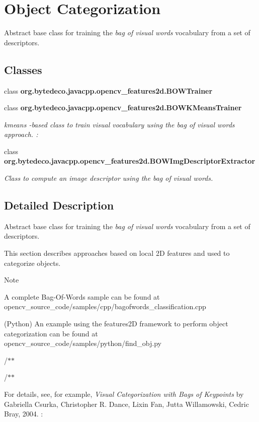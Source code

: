 \hypertarget{group__features2d__category}{}\section{Object Categorization}
\label{group__features2d__category}


Abstract base class for training the {\itshape bag of visual words} vocabulary from a set of descriptors.  


\subsection*{Classes}
\begin{DoxyCompactItemize}
\item 
class {\bfseries org.\+bytedeco.\+javacpp.\+opencv\+\_\+features2d.\+B\+O\+W\+Trainer}
\item 
class {\bfseries org.\+bytedeco.\+javacpp.\+opencv\+\_\+features2d.\+B\+O\+W\+K\+Means\+Trainer}
\begin{DoxyCompactList}\small\item\em kmeans -\/based class to train visual vocabulary using the {\itshape bag of visual words} approach. \+: \end{DoxyCompactList}\item 
class {\bfseries org.\+bytedeco.\+javacpp.\+opencv\+\_\+features2d.\+B\+O\+W\+Img\+Descriptor\+Extractor}
\begin{DoxyCompactList}\small\item\em Class to compute an image descriptor using the {\itshape bag of visual words}. \end{DoxyCompactList}\end{DoxyCompactItemize}


\subsection{Detailed Description}
Abstract base class for training the {\itshape bag of visual words} vocabulary from a set of descriptors. 

This section describes approaches based on local 2D features and used to categorize objects. 

\begin{DoxyNote}{Note}

\begin{DoxyItemize}
\item A complete Bag-\/\+Of-\/\+Words sample can be found at opencv\+\_\+source\+\_\+code/samples/cpp/bagofwords\+\_\+classification.\+cpp
\begin{DoxyItemize}
\item (Python) An example using the features2D framework to perform object categorization can be found at opencv\+\_\+source\+\_\+code/samples/python/find\+\_\+obj.\+py 
\end{DoxyItemize}
\end{DoxyItemize}
\end{DoxyNote}
/$\ast$$\ast$ 

/$\ast$$\ast$

For details, see, for example, {\itshape Visual Categorization with Bags of Keypoints} by Gabriella Csurka, Christopher R. Dance, Lixin Fan, Jutta Willamowski, Cedric Bray, 2004. \+: 